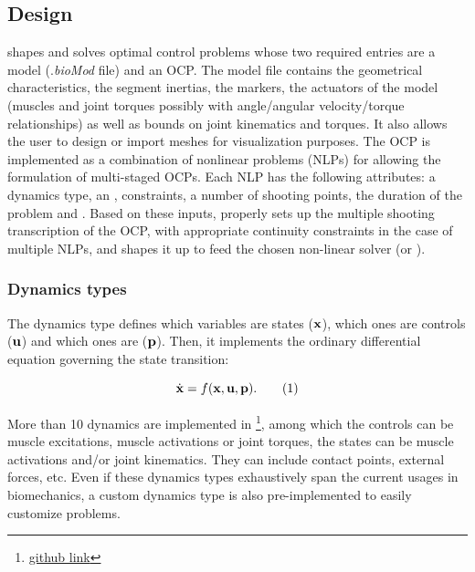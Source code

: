 \subsection{Design}
\bioptim shapes and solves optimal control problems whose two required entries are a model (.\textit{bioMod} file) and an OCP.
The model file contains the geometrical characteristics, the segment inertias, the markers, the actuators of the model (muscles and joint torques possibly with angle/angular velocity/torque relationships) as well as bounds on joint kinematics and torques. 
It also allows the user to design or import meshes for visualization purposes.
The OCP is implemented as a combination of nonlinear problems (NLPs) for allowing the formulation of multi-staged OCPs. 
Each NLP has the following attributes: a dynamics type, an , constraints, a number of shooting points, the duration of the problem and .
Based on these inputs, \bioptim properly sets up the multiple shooting transcription of the OCP, with appropriate continuity constraints in the case of multiple NLPs, and shapes it up to feed the chosen non-linear solver (\ipopt or \acados). 

\subsubsection{Dynamics types}
The dynamics type defines which variables are states ($\mathbf{x}$), which ones are controls ($\mathbf{u}$) and which ones are  ($\mathbf{p}$).
Then, it implements the ordinary differential equation governing the state transition:

\[
\dstate = f(\state, \control, \param).
\addtag
\label{eq:state_transition}
\]

\noindent More than 10 dynamics are implemented in \bioptim \footnote{\href{https://github.com/pyomeca/bioptim/blob/master/bioptim/dynamics/dynamics_functions.py}{github link}}, among which the controls can be muscle excitations, muscle activations or joint torques, the states can be muscle activations and/or joint kinematics.
They can include contact points, external forces, etc.
Even if these dynamics types exhaustively span the current usages in biomechanics, a custom dynamics type is also pre-implemented to easily customize problems.

